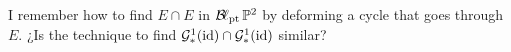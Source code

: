 \documentclass[12pt]{memoir}
\begin{document}
\begin{Qn}
    I remember how to find $E\cap E$ in $\operatorname{\mathcal{B}\!\ell}_{\text{pt}}\mathbb{P}^2$ by deforming a cycle that goes through $E$. ¿Is the technique to find $\mathcal{G}_\ast^1(\operatorname{id})\cap \mathcal{G}_\ast^1(\operatorname{id})$ similar?
\end{Qn}
\ifx\nextra\undefined
\printindex
\else\fi
\nocite{*}


\end{document}
